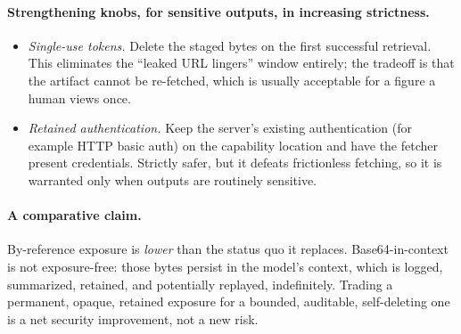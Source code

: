 \documentclass[11pt]{article}
\begin{document}
\paragraph{Strengthening knobs, for sensitive outputs, in increasing strictness.}
\begin{itemize}
\item \emph{Single-use tokens.} Delete the staged bytes on the first successful retrieval. This eliminates the ``leaked URL lingers'' window entirely; the tradeoff is that the artifact cannot be re-fetched, which is usually acceptable for a figure a human views once.
\item \emph{Retained authentication.} Keep the server's existing authentication (for example HTTP basic auth) on the capability location and have the fetcher present credentials. Strictly safer, but it defeats frictionless fetching, so it is warranted only when outputs are routinely sensitive.
\end{itemize}

\paragraph{A comparative claim.} By-reference exposure is \emph{lower} than the status quo it replaces. Base64-in-context is not exposure-free: those bytes persist in the model's context, which is logged, summarized, retained, and potentially replayed, indefinitely. Trading a permanent, opaque, retained exposure for a bounded, auditable, self-deleting one is a net security improvement, not a new risk.
\end{document}

